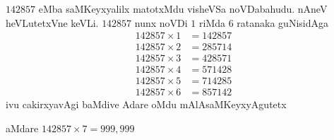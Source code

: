 \eject


$142857$ eMba saMKeyxyalilx matotxMdu visheVSa noVDabahudu. nAneV heVLutetxVne keVLi. $142857$ nunx noVDi $1$ riMda $6$ ratanaka guNisidAga 
\begin{align*}
  142857 \times 1 & = 142857\\
  142857 \times 2 & = 285714\\
  142857 \times 3 & = 428571\\
  142857 \times 4 & =571428\\
  142857 \times 5 & =714285\\
  142857 \times 6 & =857142
\end{align*}
ivu cakirxyavAgi baMdive Adare oMdu mAlAsaMKeyxyAgutetx

 aMdare $142857 \times 7 = 999,999$


